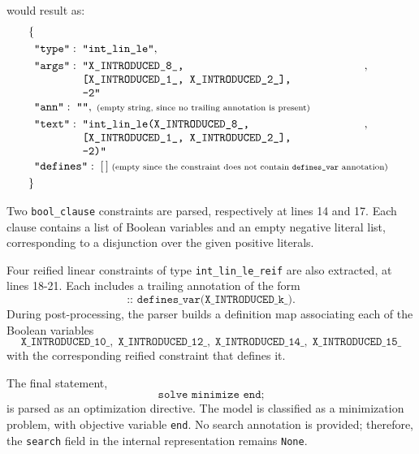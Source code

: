 \documentclass[../../main]{subfiles}
\begin{document}
would result as:
\[
\begin{aligned}
\{\\
\quad &\texttt{"type"}:\; \texttt{"int\_lin\_le"},\\
\quad &\texttt{"args"}:\; \parbox[t]{0.72\textwidth}{\ttfamily%
"X\_INTRODUCED\_8\_,\newline%
[X\_INTRODUCED\_1\_, X\_INTRODUCED\_2\_],\newline%
-2"},\\
\quad &\texttt{"ann"}:\; \texttt{""},\;\text{\scriptsize (empty string, since no trailing annotation is present)}\\
\quad &\texttt{"text"}:\; \parbox[t]{0.72\textwidth}{\ttfamily%
"int\_lin\_le(X\_INTRODUCED\_8\_,\newline%
[X\_INTRODUCED\_1\_, X\_INTRODUCED\_2\_],\newline%
-2)"},\\
\quad &\texttt{"defines"}:\; [\,]\;\text{\scriptsize (empty since the constraint does not contain \texttt{defines\_var} annotation)}\\
\}
\end{aligned}
\]

Two \texttt{bool\_clause} constraints are parsed, respectively at lines 14 and 17. Each clause contains a list of Boolean variables and an empty negative literal list, corresponding to a disjunction over the given positive literals.

Four reified linear constraints of type \texttt{int\_lin\_le\_reif} are also extracted, at lines 18-21. Each includes a trailing annotation of the form
\[
\texttt{:: defines\_var(X\_INTRODUCED\_k\_)}.
\]
During post-processing, the parser builds a definition map associating each of the Boolean variables
\[
\texttt{X\_INTRODUCED\_10\_},\;
\texttt{X\_INTRODUCED\_12\_},\;
\texttt{X\_INTRODUCED\_14\_},\;
\texttt{X\_INTRODUCED\_15\_}
\]
with the corresponding reified constraint that defines it.

The final statement,
\[
\texttt{solve minimize end;}
\]
is parsed as an optimization directive. The model is classified as a minimization problem, with objective variable \texttt{end}. No search annotation is provided; therefore, the \texttt{search} field in the internal representation remains \texttt{None}.


\end{document}
